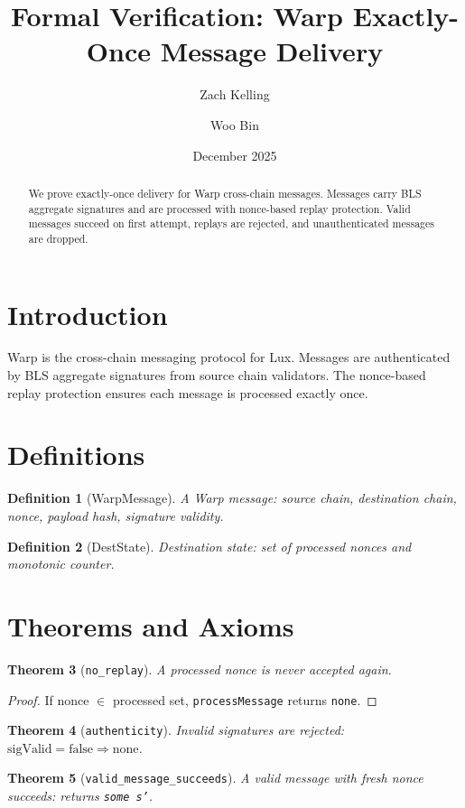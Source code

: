 \documentclass[11pt]{article}
\title{Formal Verification: Warp Exactly-Once Message Delivery}
\author{Zach Kelling \and Woo Bin}
\date{December 2025}
\newtheorem{theorem}{Theorem}
\newtheorem{definition}[theorem]{Definition}
\begin{document}
\maketitle

\begin{abstract}
We prove exactly-once delivery for Warp cross-chain messages. Messages carry BLS aggregate signatures and are processed with nonce-based replay protection. Valid messages succeed on first attempt, replays are rejected, and unauthenticated messages are dropped.
\end{abstract}

\section{Introduction}
Warp is the cross-chain messaging protocol for Lux. Messages are authenticated by BLS aggregate signatures from source chain validators. The nonce-based replay protection ensures each message is processed exactly once.

\section{Definitions}
\begin{definition}[WarpMessage]
A Warp message: source chain, destination chain, nonce, payload hash, signature validity.
\end{definition}

\begin{definition}[DestState]
Destination state: set of processed nonces and monotonic counter.
\end{definition}


\section{Theorems and Axioms}
\begin{theorem}[\texttt{no\_replay}]
A processed nonce is never accepted again.
\end{theorem}
\begin{proof}
If nonce $\in$ processed set, \texttt{processMessage} returns \texttt{none}.
\end{proof}

\begin{theorem}[\texttt{authenticity}]
Invalid signatures are rejected: $\text{sigValid} = \text{false} \Rightarrow \text{none}$.
\end{theorem}

\begin{theorem}[\texttt{valid\_message\_succeeds}]
A valid message with fresh nonce succeeds: returns \texttt{some s'}.
\end{theorem}
\end{document}
